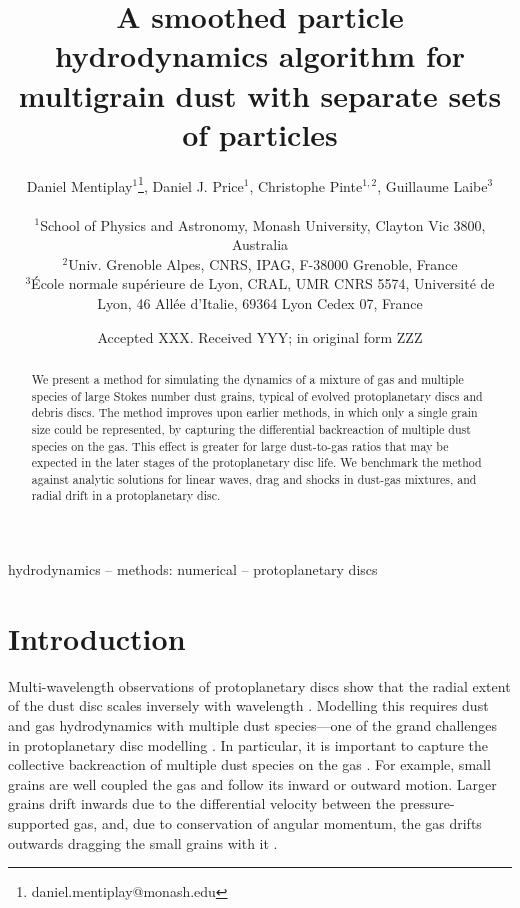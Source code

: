 \documentclass[fleqn,usenatbib]{mnras}
\title[SPH for multigrain dust]{A smoothed particle hydrodynamics algorithm for
multigrain dust with separate sets of particles}
\author[Mentiplay, Price, \& Pinte]{%
   \parbox{\textwidth}{%
      Daniel Mentiplay\(^{1}\)\thanks{daniel.mentiplay@monash.edu},
      Daniel J. Price\(^{1}\),
      Christophe Pinte\(^{1,2}\),
      Guillaume Laibe\(^{3}\)
   }\\
   \(^{1}\)School of Physics and Astronomy, Monash University, Clayton Vic 3800,
   Australia \\
   \(^{2}\)Univ. Grenoble Alpes, CNRS, IPAG, F-38000 Grenoble, France \\
   \(^{3}\)\'{E}cole normale sup\'{e}rieure de Lyon, CRAL, UMR CNRS 5574,
   Universit\'{e} de Lyon, 46 All\'{e}e d’Italie, 69364 Lyon Cedex 07, France
 \\
}
\date{Accepted XXX. Received YYY; in original form ZZZ}
\begin{document}
\label{firstpage}
\pagerange{\pageref{firstpage}--\pageref{lastpage}}
\maketitle

\begin{abstract}
   We present a method for simulating the dynamics of a mixture of gas and
   multiple species of large Stokes number dust grains, typical of evolved
   protoplanetary discs and debris discs. The method improves upon earlier
   methods, in which only a single grain size could be represented, by capturing
   the differential backreaction of multiple dust species on the gas. This
   effect is greater for large dust-to-gas ratios that may be expected in the
   later stages of the protoplanetary disc life. We benchmark the method against
   analytic solutions for linear waves, drag and shocks in dust-gas mixtures,
   and radial drift in a protoplanetary disc.
\end{abstract}

\begin{keywords}
hydrodynamics -- methods: numerical -- protoplanetary discs
\end{keywords}



\section{Introduction}

Multi-wavelength observations of protoplanetary discs show that the radial
extent of the dust disc scales inversely with wavelength
\citep{Andrews2015PASP..127..961A}. Modelling this requires dust and gas
hydrodynamics with multiple dust species---one of the grand challenges in
protoplanetary disc modelling \citep{Haworth2016PASA...33...53H}. In particular,
it is important to capture the collective backreaction of multiple dust species
on the gas \citep{Dipierro2018MNRAS.479.4187D}. For example, small grains are
well coupled the gas and follow its inward or outward motion. Larger grains
drift inwards due to the differential velocity between the pressure-supported
gas, and, due to conservation of angular momentum, the gas drifts outwards
dragging the small grains with it \citep{Laibe2014MNRAS.444.1940L}.
\end{document}
